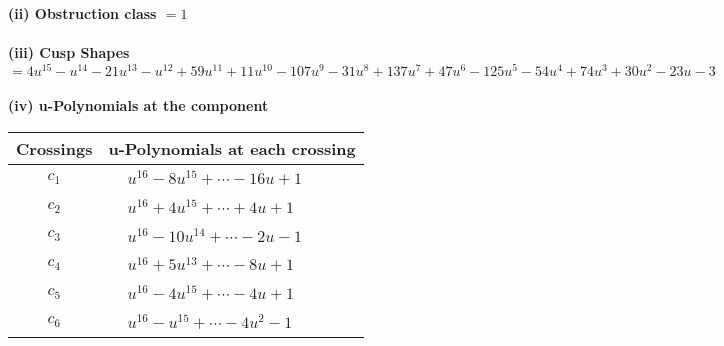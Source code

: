 \documentclass[1p]{elsarticle_modified}
\theoremstyle{definition}
\begin{document}
\flushleft \textbf{(ii) Obstruction class $= 1$}\\~\\
\flushleft \textbf{(iii) Cusp Shapes $= 4 u^{15}- u^{14}-21 u^{13}- u^{12}+59 u^{11}+11 u^{10}-107 u^9-31 u^8+137 u^7+47 u^6-125 u^5-54 u^4+74 u^3+30 u^2-23 u-3$}\\~\\
\newpage\renewcommand{\arraystretch}{1}
\flushleft \textbf{(iv) u-Polynomials at the component}\newline \\
\begin{tabular}{m{50pt}|m{274pt}}
Crossings & \hspace{64pt}u-Polynomials at each crossing \\
\hline $$\begin{aligned}c_{1}\end{aligned}$$&$\begin{aligned}
&u^{16}-8 u^{15}+\cdots-16 u+1
\end{aligned}$\\
\hline $$\begin{aligned}c_{2}\end{aligned}$$&$\begin{aligned}
&u^{16}+4 u^{15}+\cdots+4 u+1
\end{aligned}$\\
\hline $$\begin{aligned}c_{3}\end{aligned}$$&$\begin{aligned}
&u^{16}-10 u^{14}+\cdots-2 u-1
\end{aligned}$\\
\hline $$\begin{aligned}c_{4}\end{aligned}$$&$\begin{aligned}
&u^{16}+5 u^{13}+\cdots-8 u+1
\end{aligned}$\\
\hline $$\begin{aligned}c_{5}\end{aligned}$$&$\begin{aligned}
&u^{16}-4 u^{15}+\cdots-4 u+1
\end{aligned}$\\
\hline $$\begin{aligned}c_{6}\end{aligned}$$&$\begin{aligned}
&u^{16}- u^{15}+\cdots-4 u^2-1
\end{aligned}$\\

\end{tabular}
\end{document}
